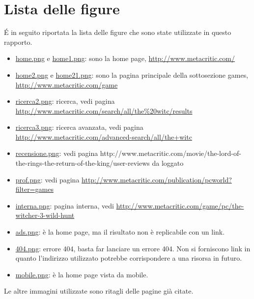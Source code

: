 \documentclass[12pt]{article}
\begin{document}
	\section{Lista delle figure}
	\'E in seguito riportata la lista delle figure che sono state utilizzate in questo rapporto.
	\begin{itemize}
	\item \href{home.png}{home.png} e \href{home1.png}{home1.png}: sono la home page, \url{http://www.metacritic.com/}
	\item \href{home.png}{home2.png} e \href{home.png}{home21.png}: sono la pagina principale della sottosezione games, \url{http://www.metacritic.com/game}
	\item \href{ricerca2.png}{ricerca2.png}: ricerca, vedi pagina \url{http://www.metacritic.com/search/all/the\%20witc/results}
	\item \href{ricerca3.png}{ricerca3.png}: ricerca avanzata, vedi pagina  \url{http://www.metacritic.com/advanced-search/all/the+witc}
	\item \href{recensione.png}{recensione.png}: vedi pagina http://www.metacritic.com/movie/the-lord-of-the-rings-the-return-of-the-king/user-reviews da loggato
	\item \href{prof.png}{prof.png}: vedi pagina \url{http://www.metacritic.com/publication/pcworld?filter=games}
	\item \href{interna.png}{interna.png}: pagina interna, vedi \url{http://www.metacritic.com/game/pc/the-witcher-3-wild-hunt}
	\item \href{ads.png}{ads.png}: è la home page, ma il risultato non è replicabile con un link.
	\item \href{404.png}{404.png}: errore 404, basta far lanciare un errore 404. Non si forniscono link in quanto l'indirizzo utilizzato potrebbe corrispondere a una risorsa in futuro.
	\item \href{mobile.png}{mobile.png}: è la home page vista da mobile.
	\end{itemize}
		Le altre immagini utilizzate sono ritagli delle pagine già citate.
		\newpage
		\listoffigures
		
\end{document}
